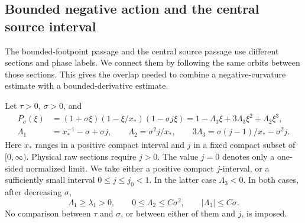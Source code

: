\subsection{Bounded negative action and the central source interval}
\label{subsec:bounded-action}

The bounded-footpoint passage and the central source passage use different
sections and phase labels. We connect them by following the same orbits
between those sections. This gives the overlap needed to combine a
negative-curvature estimate with a bounded-derivative estimate.

Let \(\tau>0\), \(\sigma>0\), and
\begin{equation}\label{bd:polynomial}
\begin{split}
 P_\sigma(\xi)
 &=(1+\sigma\xi)(1-\xi/x_*)(1-\sigma j\xi)
   =1-\Lambda_1\xi+3\Lambda_3\xi^2+\Lambda_2\xi^3,\\
 \Lambda_1&=x_*^{-1}-\sigma+\sigma j,\qquad
 \Lambda_2=\sigma^2j/x_*,\qquad
 3\Lambda_3=\sigma(j-1)/x_*-\sigma^2j .
\end{split}
\end{equation}
Here \(x_*\) ranges in a positive compact interval and \(j\) in a
fixed compact subset of \([0,\infty)\).  Physical raw sections require
\(j>0\).  The value \(j=0\) denotes only a one-sided normalized limit.
We take either a positive compact \(j\)-interval, or a sufficiently
small interval \(0\le j\le j_0<1\).  In the latter case
\(\Lambda_3<0\).  In both cases, after decreasing \(\sigma\),
\[
 \Lambda_1\ge\lambda_1>0,\qquad
 0\le\Lambda_2\le C\sigma^2,\qquad |\Lambda_3|\le C\sigma.
\]
No comparison between \(\tau\) and \(\sigma\), or between either of
them and \(j\), is imposed.

